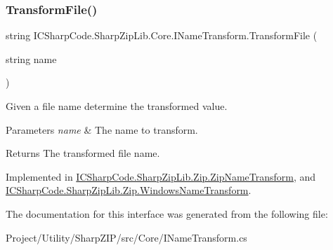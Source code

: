 \mbox{\label{interface_i_c_sharp_code_1_1_sharp_zip_lib_1_1_core_1_1_i_name_transform_ae6d37bd063a1b8844bca4a7ccbd6ec7a}} 
\subsubsection{\texorpdfstring{Transform\+File()}{TransformFile()}}
{\footnotesize\ttfamily string I\+C\+Sharp\+Code.\+Sharp\+Zip\+Lib.\+Core.\+I\+Name\+Transform.\+Transform\+File (\begin{DoxyParamCaption}\item[{string}]{name }\end{DoxyParamCaption})}



Given a file name determine the transformed value. 


\begin{DoxyParams}{Parameters}
{\em name} & The name to transform.\\
\hline
\end{DoxyParams}
\begin{DoxyReturn}{Returns}
The transformed file name.
\end{DoxyReturn}


Implemented in \hyperlink{class_i_c_sharp_code_1_1_sharp_zip_lib_1_1_zip_1_1_zip_name_transform_ad6797c96c6254d7563405a20f4f7ef13}{I\+C\+Sharp\+Code.\+Sharp\+Zip\+Lib.\+Zip.\+Zip\+Name\+Transform}, and \hyperlink{class_i_c_sharp_code_1_1_sharp_zip_lib_1_1_zip_1_1_windows_name_transform_aab54d8254c71fcc7b07551a60551e11a}{I\+C\+Sharp\+Code.\+Sharp\+Zip\+Lib.\+Zip.\+Windows\+Name\+Transform}.



The documentation for this interface was generated from the following file\+:\begin{DoxyCompactItemize}
\item 
Project/\+Utility/\+Sharp\+Z\+I\+P/src/\+Core/I\+Name\+Transform.\+cs\end{DoxyCompactItemize}
